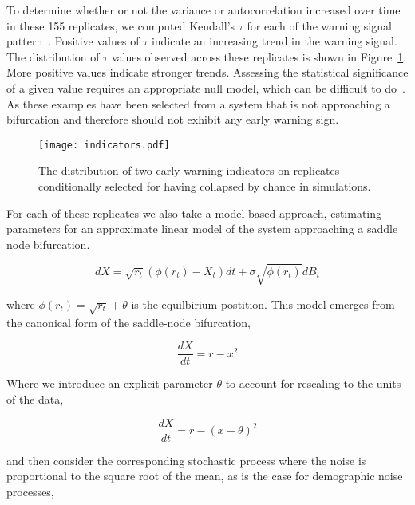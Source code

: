 \documentclass[authoryear,review,12pt]{elsarticle}
\begin{document}
To determine whether or not the variance or autocorrelation increased 
over time in these 155 replicates, we computed Kendall's $\tau$ for each of the
warning signal pattern~\citep{Dakos2008, Dakos2010}.  Positive values of $\tau$ 
indicate an increasing trend in the warning signal.  The distribution of $\tau$ 
values observed across these replicates is shown in Figure~\ref{fig:indicator}.
More positive values indicate stronger trends. Assessing the statistical significance
of a given value requires an appropriate null model, which can be difficult 
to do~\citep{Dakos2008}. As these examples have been selected from a system
that is not approaching a bifurcation and therefore should not exhibit any 
early warning sign. %


\begin{figure}[H]
  \begin{center}
    \texttt{[image: indicators.pdf]}
  \end{center}
  \caption{The distribution of two early warning indicators on replicates conditionally selected for having collapsed by chance in simulations.}
  \label{fig:indicator}
\end{figure}

For each of these replicates we also take a model-based approach, estimating 
parameters for an approximate linear model of the system approaching a
saddle node bifurcation.


\begin{equation}
  dX = \sqrt{ r_t } (\phi(r_t) - X_t) dt +
  \sigma\sqrt{\phi(r_t) } d B_t \label{LSN}
\end{equation}

where \( \phi(r_t) = \sqrt{r_t} +\theta \) is the equilbirium postition.  
This model emerges from the canonical form of the saddle-node bifurcation,

\begin{equation}
  \frac{dX}{dt} = r - x^2
\end{equation}

Where we introduce an explicit parameter $\theta$ to account for rescaling
to the units of the data,

\begin{equation}
   \frac{dX}{dt} = r - (x-\theta)^2
\end{equation}

and then consider the corresponding stochastic process where the noise is
proportional to the square root of the mean, as is the case for demographic
noise processes,
\end{document}
